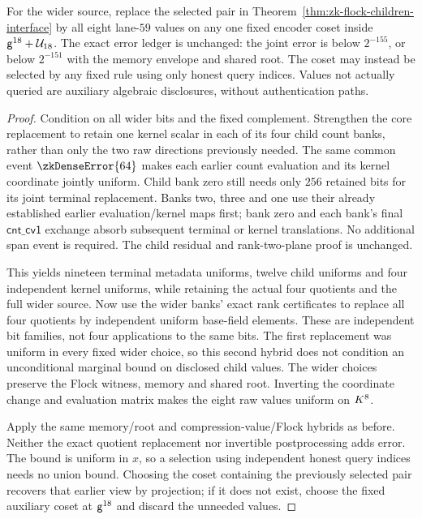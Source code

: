\begin{theorem}\label{thm:zk-flock-eight-interface}
For the wider source, replace the selected pair in Theorem~\ref{thm:zk-flock-children-interface} by all eight lane-$59$ values on any one fixed encoder coset inside $\mathsf{g}^{18}+\mathcal{U}_{18}$. The exact error ledger is unchanged: the joint error is below $2^{-155}$, or below $2^{-151}$ with the memory envelope and shared root. The coset may instead be selected by any fixed rule using only honest query indices. Values not actually queried are auxiliary algebraic disclosures, without authentication paths.
\end{theorem}
\begin{proof}
Condition on all wider bits and the fixed complement. Strengthen the core replacement to retain one kernel scalar in each of its four child count banks, rather than only the two raw directions previously needed. The same common event $\zkDenseError{64}$ makes each earlier count evaluation and its kernel coordinate jointly uniform. Child bank zero still needs only $256$ retained bits for its joint terminal replacement. Banks two, three and one use their already established earlier evaluation/kernel maps first; bank zero and each bank's final $\mathsf{cnt\_cv1}$ exchange absorb subsequent terminal or kernel translations. No additional span event is required. The child residual and rank-two-plane proof is unchanged.

This yields nineteen terminal metadata uniforms, twelve child uniforms and four independent kernel uniforms, while retaining the actual four quotients and the full wider source. Now use the wider banks' exact rank certificates to replace all four quotients by independent uniform base-field elements. These are independent bit families, not four applications to the same bits. The first replacement was uniform in every fixed wider choice, so this second hybrid does not condition an unconditional marginal bound on disclosed child values. The wider choices preserve the Flock witness, memory and shared root. Inverting the coordinate change and evaluation matrix makes the eight raw values uniform on $K^8$.

Apply the same memory/root and compression-value/Flock hybrids as before. Neither the exact quotient replacement nor invertible postprocessing adds error. The bound is uniform in $x$, so a selection using independent honest query indices needs no union bound. Choosing the coset containing the previously selected pair recovers that earlier view by projection; if it does not exist, choose the fixed auxiliary coset at $\mathsf{g}^{18}$ and discard the unneeded values.
\end{proof}

